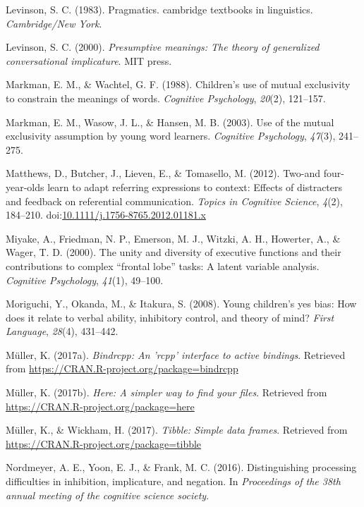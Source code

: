 \documentclass[man]{apa6}
\begin{document}
\hypertarget{ref-levinson1983}{}
Levinson, S. C. (1983). Pragmatics. cambridge textbooks in linguistics.
\emph{Cambridge/New York}.

\hypertarget{ref-levinson2000}{}
Levinson, S. C. (2000). \emph{Presumptive meanings: The theory of
generalized conversational implicature}. MIT press.

\hypertarget{ref-markman1988children}{}
Markman, E. M., \& Wachtel, G. F. (1988). Children's use of mutual
exclusivity to constrain the meanings of words. \emph{Cognitive
Psychology}, \emph{20}(2), 121--157.

\hypertarget{ref-markman2003use}{}
Markman, E. M., Wasow, J. L., \& Hansen, M. B. (2003). Use of the mutual
exclusivity assumption by young word learners. \emph{Cognitive
Psychology}, \emph{47}(3), 241--275.

\hypertarget{ref-matthews2012}{}
Matthews, D., Butcher, J., Lieven, E., \& Tomasello, M. (2012). Two-and
four-year-olds learn to adapt referring expressions to context: Effects
of distracters and feedback on referential communication. \emph{Topics
in Cognitive Science}, \emph{4}(2), 184--210.
doi:\href{https://doi.org/10.1111/j.1756-8765.2012.01181.x}{10.1111/j.1756-8765.2012.01181.x}

\hypertarget{ref-miyake2000unity}{}
Miyake, A., Friedman, N. P., Emerson, M. J., Witzki, A. H., Howerter,
A., \& Wager, T. D. (2000). The unity and diversity of executive
functions and their contributions to complex ``frontal lobe'' tasks: A
latent variable analysis. \emph{Cognitive Psychology}, \emph{41}(1),
49--100.

\hypertarget{ref-moriguchi2008young}{}
Moriguchi, Y., Okanda, M., \& Itakura, S. (2008). Young children's yes
bias: How does it relate to verbal ability, inhibitory control, and
theory of mind? \emph{First Language}, \emph{28}(4), 431--442.

\hypertarget{ref-R-bindrcpp}{}
Müller, K. (2017a). \emph{Bindrcpp: An 'rcpp' interface to active
bindings}. Retrieved from
\url{https://CRAN.R-project.org/package=bindrcpp}

\hypertarget{ref-R-here}{}
Müller, K. (2017b). \emph{Here: A simpler way to find your files}.
Retrieved from \url{https://CRAN.R-project.org/package=here}

\hypertarget{ref-R-tibble}{}
Müller, K., \& Wickham, H. (2017). \emph{Tibble: Simple data frames}.
Retrieved from \url{https://CRAN.R-project.org/package=tibble}

\hypertarget{ref-nordmeyer2016}{}
Nordmeyer, A. E., Yoon, E. J., \& Frank, M. C. (2016). Distinguishing
processing difficulties in inhibition, implicature, and negation. In
\emph{Proceedings of the 38th annual meeting of the cognitive science
society}.
\end{document}
